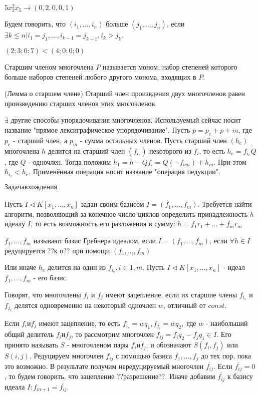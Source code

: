 \documentclass[12pt]{article}
\begin{document}
\example $5x_2^2x_5 \rightarrow (0,2,0,0,1)$

\opr Будем говорить, что $(i_1,\dots,i_n)$ больше $(j_1,\dots,j_n)$, если $\exists k \le n | i_1 = j_1, \dots, i_{k-1} = j_{k-1},i_k > j_k$.

\example $(2;3;0;7) < (4;0;0;0)$

\opr Старшим членом многочлена $P$ называется моном, набор степеней которого больше наборов степеней любого другого монома, входящих в $P$.

\lem (Лемма о старшем члене) Старший член произвдения двух многочленов равен произведению старших членов этих многочленов.

\note $\exists$ другие способы упорядочивания многочленов. Используемый сейчас носит название "прямое лексиграфическое упорядочивание". Пусть $p = p_e + p+m$, где $p_e$ - старший член, а  $p_m$ - сумма остальных членов. Пусть старший член $(h_e)$ многочлена $h$ делится на старший член $(f_{i_e})$ некоторого из $f_i$, то есть $h_e = f_{i_e} \dot Q$, где $Q$ - одночлен. Тогда положим $h_1 = h - Qf_i = Q(-f_{\nu m}) + h_m$. При этом $h_{i_e} < h_e$. Применённая операция носит название "операция педукции".

$\underline{Задача вхождения}$ 

Пусть $I \triangleleft K[x_1,\dots,x_n]$ задан своим базисом $I = (f_1,\dots,f_m)$. Требуется найти алгоритм, позволяющий за конечное число циклов определить принадлежность $h$ идеалу $I$, то есть возможность его разложения в сумму: $h = f_1r_1 + \dots + f_mr_m$

\opr $f_1,\dots,f_m$ называют базис Гребнера идеалом, если $I = (f_1,\dots,f_m)$, если $\forall h \in I$ редуцируется ??к о?? при помощи $(f_1,\dots,f_m)$

Или иначе $h_e$ делится на один из $f_{i_e},i \in \overline{1,m}$. Пусть $I \triangleleft K[x_1,\dots,x_n]$ - идеал $f_1,\dots,f_m $ - его базис.

\opr Говорят, что многочлены $f_i$ и $f_j$ имеют зацепление, если их старшие члены $f_{i_e}$ и $f_{j_e}$ делятся одновременно на некоторый одночлен $w$, отличный от $const$.

Если $f_i и f_j$ имеют зацепление, то есть $f_{i_c} = wq_1, f_{j_c} = wq_2,$ где $w$ - наибольший общий делитель $f_i и f_j$, то рассмотрим многочлен $f_{ij} = f_iq_2 - f_jq_1 \in I$. Его принято называть $S$ - многочленом пары $f_i и f_j$, и обозначают $S(f_i,f_j)$ или $S(i,j)$. Редуцируем многочлен $f_{ij}$ с помощью базиса $f_1,\dots,f_j$ до тех пор, пока это возможно. В результате получим нередуцируемый многочлен $\overline{f_{ij}}$. Если $\overline{f_{ij}} = 0$, то будем говорить, что зацепление ??разрешение??. Иначе добавим $\overline{f_{ij}}$ к базису идеала $I: f_{m+1} = \overline{f_{ij}}$.
\end{document}
